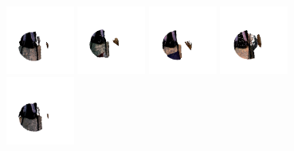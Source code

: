 \documentclass[11pt,a4paper]{kth-mag}
\begin{document}
\begin{figure}
{{      \includegraphics[width=0.2\textwidth]{images/queryresults/backpack_0}
      \includegraphics[width=0.2\textwidth]{images/queryresults/backpack_1}
      \includegraphics[width=0.2\textwidth]{images/queryresults/backpack_2}
      \includegraphics[width=0.2\textwidth]{images/queryresults/backpack_3}
      \includegraphics[width=0.2\textwidth]{images/queryresults/backpack_4}
    }\\
  }
  \centerline{
    }
\end{figure}
\end{document}
